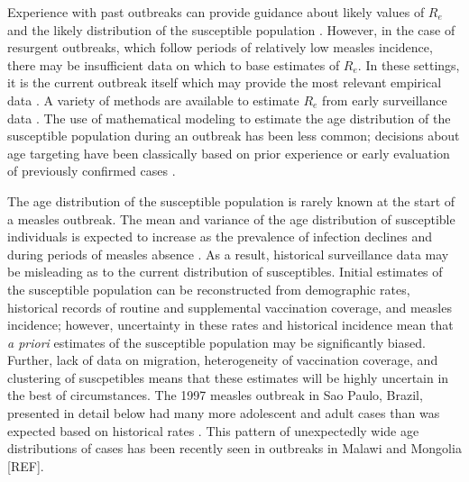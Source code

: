 Experience with past outbreaks can provide guidance about likely values
of \(R_{e}\) \cite{Durrheim_2014} and the likely distribution of the
susceptible population \cite{Goodson_2011, 25803382}. However, in
the case of resurgent outbreaks, which follow periods of relatively low
measles incidence, there may be insufficient data on which to base
estimates of \(R_e\). In these settings, it is the current outbreak itself which
may provide the most relevant empirical data \cite{Durrheim_2014, Merl_2009, Shea_2014}. A variety of methods are available to estimate \(R_{e}\) from early surveillance data \cite{Durrheim_2014}\cite{Chiew_2013}\cite{Ferrari_2005}\cite{Lipsitch_2003} . The use of mathematical modeling to estimate the age 
distribution of the susceptible population during an outbreak has been
less common; decisions about age targeting have been classically based
on prior experience or early evaluation of previously confirmed cases \cite{Minetti_2013a}.

The age distribution of the susceptible population is rarely known at
the start of a measles outbreak. The mean and variance of the age
distribution of susceptible individuals is expected to increase as the
prevalence of infection declines \cite{Goodson_2011, Ferrari_2013} and
during periods of measles absence \cite{Durrheim_2014}. As a result,
historical surveillance data may be misleading as to the current
distribution of susceptibles. Initial estimates of the susceptible
population can be reconstructed from demographic rates, historical
records of routine and supplemental vaccination coverage, and measles
incidence\cite{Takahashi_2015}; however, uncertainty in these rates and historical incidence
mean that \emph{a priori} estimates of the susceptible population may be
significantly biased. Further, lack of data on migration, heterogeneity of vaccination coverage, and clustering of suscpetibles means that these estimates will be highly uncertain in the best of circumstances. The 1997 measles outbreak in Sao Paulo, Brazil,
presented in detail below had many more adolescent and adult cases than
was expected based on historical rates \cite{Camargo_2000}. This pattern of
unexpectedly wide age distributions of cases has been recently seen in
outbreaks in Malawi \cite{Minetti_2013} and Mongolia {[}REF{]}.

